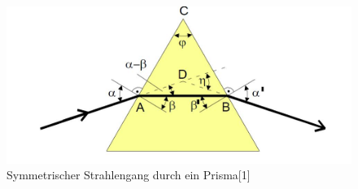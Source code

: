 	\begin{figure}[h]
		\begin{center}
		\includegraphics[scale=0.4]{picsymstrahl.jpg}
		\caption{Symmetrischer Strahlengang durch ein Prisma[1]}
		\label{picsymstrahl}
		\end{center}	
	\end{figure}